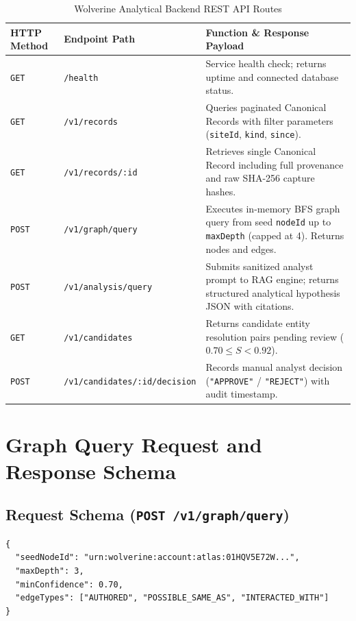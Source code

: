 \begin{table}[htbp]
\centering
\small
\caption{Wolverine Analytical Backend REST API Routes}
\label{tab:api-endpoints}
\begin{tabular}{@{}llp{8.0cm}@{}}
\toprule
\textbf{HTTP Method} & \textbf{Endpoint Path} & \textbf{Function \& Response Payload} \\ \midrule
\texttt{GET} & \texttt{/health} & Service health check; returns uptime and connected database status. \\ \addlinespace
\texttt{GET} & \texttt{/v1/records} & Queries paginated Canonical Records with filter parameters (\texttt{siteId}, \texttt{kind}, \texttt{since}). \\ \addlinespace
\texttt{GET} & \texttt{/v1/records/:id} & Retrieves single Canonical Record including full provenance and raw SHA-256 capture hashes. \\ \addlinespace
\texttt{POST} & \texttt{/v1/graph/query} & Executes in-memory BFS graph query from seed \texttt{nodeId} up to \texttt{maxDepth} (capped at 4). Returns nodes and edges. \\ \addlinespace
\texttt{POST} & \texttt{/v1/analysis/query} & Submits sanitized analyst prompt to RAG engine; returns structured analytical hypothesis JSON with citations. \\ \addlinespace
\texttt{GET} & \texttt{/v1/candidates} & Returns candidate entity resolution pairs pending review ($0.70 \le S < 0.92$). \\ \addlinespace
\texttt{POST} & \texttt{/v1/candidates/:id/decision} & Records manual analyst decision (\texttt{"APPROVE"} / \texttt{"REJECT"}) with audit timestamp. \\ \bottomrule
\end{tabular}
\end{table}

\section{Graph Query Request and Response Schema}
\subsection{Request Schema (\texttt{POST /v1/graph/query})}
\begin{verbatim}
{
  "seedNodeId": "urn:wolverine:account:atlas:01HQV5E72W...",
  "maxDepth": 3,
  "minConfidence": 0.70,
  "edgeTypes": ["AUTHORED", "POSSIBLE_SAME_AS", "INTERACTED_WITH"]
}
\end{verbatim}

